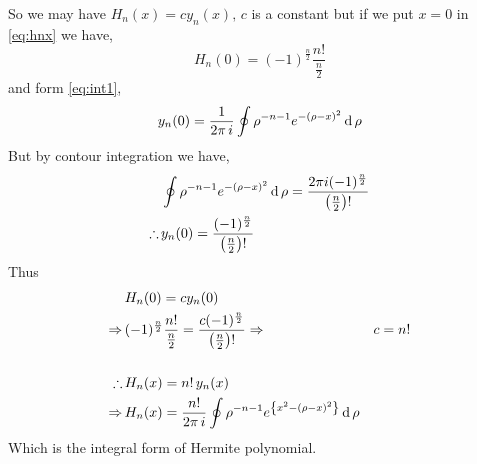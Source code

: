 \documentclass[../main-sheet.tex]{subfiles}
\begin{document}
So we may have \( H_n(x)=cy_n(x),\,c \) is a constant but if we put \( x=0 \) in \eqref{eq:hnx} we have,
\[
    H_n(0)=(-1)^{\frac{n}{2}}\frac{n!}{\frac{n}{2}}
\]
and form \eqref{eq:int1},
\[
    y_n(0)=\frac{1}{2\pi \,i} \oint \rho^{-n-1}e^{-(\rho-x)^2}\,\mathrm{d}\,\rho
\]
But by contour integration we have,
\begin{align*}
    &\oint \rho^{-n-1}e^{-(\rho-x)^2}\,\mathrm{d}\,\rho=\frac{2\pi i (-1)^{\frac{n}{2}}}{\left( \frac{n}{2} \right)!}\\
    \therefore\, & y_n(0)=\frac{(-1)^{\frac{n}{2}}}{\left( \frac{n}{2} \right)!}
\end{align*}
Thus 
\begin{align*}
    & H_n(0)=cy_n(0)\\
    \Rightarrow\, &(-1)^{\frac{n}{2}}\frac{n!}{\frac{n}{2}}=\frac{c(-1)^{\frac{n}{2}}}{\left( \frac{n}{2} \right)!}
    \Rightarrow\, &c=n!\\
    &\\
    \therefore\, &H_n(x)=n!\,y_n(x)\\
    \Rightarrow\, &H_n(x)=\frac{n!}{2\pi \,i} \oint \rho^{-n-1}e^{\left\{ x^2-(\rho-x)^2\right\}}\,\mathrm{d}\,\rho
\end{align*}
Which is the integral form of Hermite polynomial.
\end{document}
